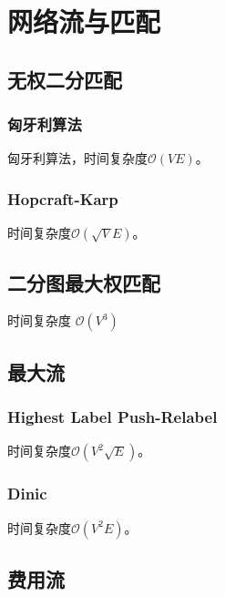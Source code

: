 \section{网络流与匹配}

\subsection{无权二分匹配}

\subsubsection{匈牙利算法}

匈牙利算法，时间复杂度$\mathcal{O}(VE)$。


\subsubsection{Hopcraft-Karp}

时间复杂度$\mathcal{O}(\sqrt{V}E)$。


\subsection{二分图最大权匹配}

时间复杂度 $\mathcal{O}(V^3)$



\subsection{最大流}

\subsubsection{Highest Label Push-Relabel}
时间复杂度$\mathcal{O}(V^2 \sqrt{E})$。


\subsubsection{Dinic}
时间复杂度$\mathcal{O}(V^2E)$。


\subsection{费用流}

